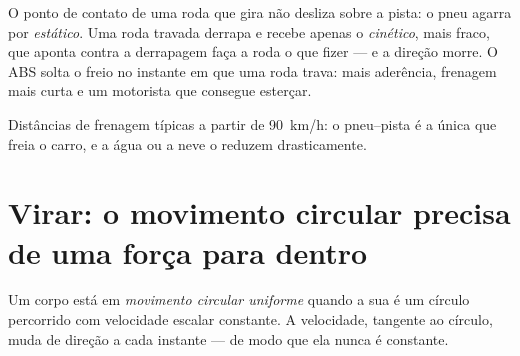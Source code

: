 \begin{remark}\label{rem:g11:forces-and-motion:abs}
O ponto de contato de uma roda que gira não desliza sobre a pista: o pneu
agarra por  \emph{estático}. Uma roda travada derrapa e recebe
apenas o  \emph{cinético}, mais fraco, que aponta contra a derrapagem
faça a roda o que fizer --- e a direção morre. O ABS solta o freio no
instante em que uma roda trava: mais aderência, frenagem mais curta e um
motorista que consegue esterçar.
\end{remark}

\begin{omfigure}

{\small Distâncias de frenagem típicas a partir de \qty{90}{km/h}: o
 pneu--pista é a única  que freia o carro, e a água ou a neve
o reduzem drasticamente.}
\end{omfigure}

\section{Virar: o movimento circular precisa de uma força para dentro}

\begin{definition}\label{def:g11:forces-and-motion:ucm}
Um corpo está em \emph{movimento circular uniforme} quando a sua  é um círculo percorrido com
velocidade escalar constante. A velocidade, tangente ao círculo, muda de
direção a cada instante --- de modo que ela nunca é constante.
\end{definition}

